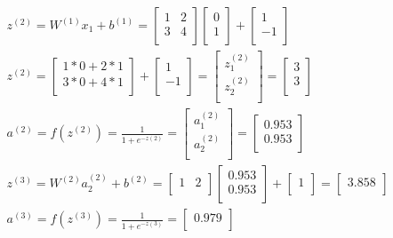 \documentclass[leqno]{article}
\begin{document}
\begin{gather*}
\begin{split}
&z^{(2)} = W^{(1)}x_1 + b^{(1)} =
  \begin{bmatrix}
  1 & 2\\
  3 & 4\\ 
  \end{bmatrix}
  \begin{bmatrix}
  0\\
  1\\ 
  \end{bmatrix}
  +
 \begin{bmatrix}
  1\\
  -1\\ 
  \end{bmatrix}
\\
&z^{(2)} = 
  \begin{bmatrix}
  1*0 + 2*1\\
  3*0 + 4*1\\ 
  \end{bmatrix}
  +
 \begin{bmatrix}
  1\\
  -1\\ 
  \end{bmatrix}
=
 \begin{bmatrix}
  z_1^{(2)}\\
  z_2^{(2)}\\ 
  \end{bmatrix}
=
 \begin{bmatrix}
  3\\
  3\\ 
  \end{bmatrix}
\\
&a^{(2)} = f(z^{(2)}) = \frac{1}{1 + e^{-z{(2)}}} =
 \begin{bmatrix}
   a_1^{(2)}\\
   a_2^{(2)}\\ 
  \end{bmatrix}
=
 \begin{bmatrix}
   0.953\\
   0.953\\ 
  \end{bmatrix}
\\
&z^{(3)} = W^{(2)}a_2^{(2)} + b^{(2)} =
 \begin{bmatrix}
   1 & 2\\
  \end{bmatrix}
 \begin{bmatrix}
   0.953\\
   0.953\\ 
  \end{bmatrix} 
  +
   \begin{bmatrix}
   1\\
  \end{bmatrix}
  =
 \begin{bmatrix}
   3.858\\ 
  \end{bmatrix}
\\
&a^{(3)} = f(z^{(3)}) = \frac{1}{1 + e^{-z{(3)}}} =
 \begin{bmatrix}
   0.979\\ 
  \end{bmatrix}
\end{split}
\end{gather*}
\end{document}
